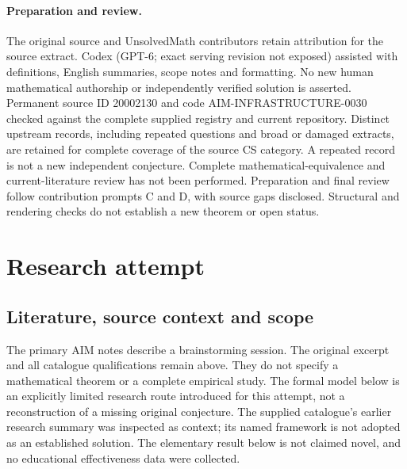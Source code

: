 \documentclass[11pt]{article}
\begin{document}
\paragraph{Preparation and review.}
The original source and UnsolvedMath contributors retain attribution for the source extract. Codex (GPT-6; exact serving revision not exposed) assisted with definitions, English summaries, scope notes and formatting. No new human mathematical authorship or independently verified solution is asserted. Permanent source ID 20002130 and code AIM-INFRASTRUCTURE-0030 checked against the complete supplied registry and current repository. Distinct upstream records, including repeated questions and broad or damaged extracts, are retained for complete coverage of the source CS category. A repeated record is not a new independent conjecture. Complete mathematical-equivalence and current-literature review has not been performed. Preparation and final review follow contribution prompts C and D, with source gaps disclosed. Structural and rendering checks do not establish a new theorem or open status.
\label{end:20002130}

\section{Research attempt}
\subsection{Literature, source context and scope}
The primary AIM notes describe a brainstorming session. The original excerpt and all catalogue qualifications remain above. They do not specify a mathematical theorem or a complete empirical study. The formal model below is an explicitly limited research route introduced for this attempt, not a reconstruction of a missing original conjecture. The supplied catalogue's earlier research summary was inspected as context; its named framework is not adopted as an established solution. The elementary result below is not claimed novel, and no educational effectiveness data were collected.
\end{document}
